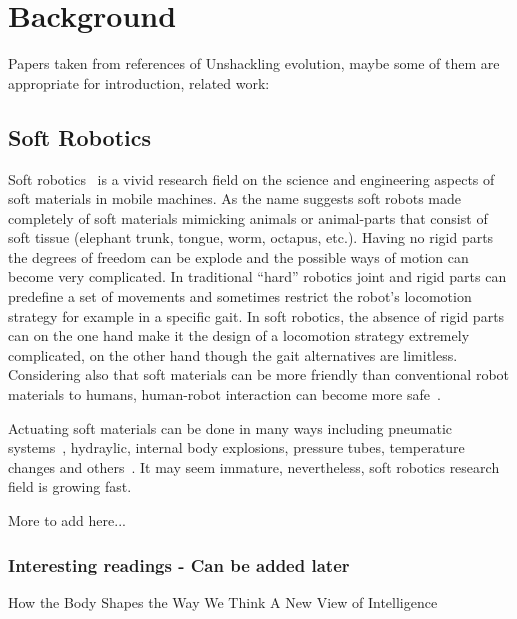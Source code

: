 
\chapter{Background} %

\label{Background} %




Papers taken from references of Unshackling evolution, maybe some of them are appropriate for introduction, related work:\\
\cite{stanley2003taxonomy}


\section{Soft Robotics}

Soft robotics~\cite{trivedi2008soft, pfeifer2012challenges} is a vivid research field on the science and engineering aspects of soft materials in mobile machines. As the name suggests soft robots made completely of soft materials mimicking animals or animal-parts that consist of soft tissue (elephant trunk, tongue, worm, octapus, etc.). Having no rigid parts the degrees of freedom can be explode and the possible ways of motion can become very complicated. In traditional ``hard'' robotics joint and rigid parts can predefine a set of movements and sometimes restrict the robot's locomotion strategy for example in a specific gait. In soft robotics, the absence of rigid parts can on the one hand make it the design of a locomotion strategy extremely complicated, on the other hand though the gait alternatives are limitless. Considering also that soft materials can be more friendly than conventional robot materials to humans, human-robot interaction can become more safe~\cite{sanan2011continuum}.

Actuating soft materials can be done in many ways including pneumatic systems~\cite{ilievski2011soft, shepherd2011multigait}, hydraylic, internal body explosions, pressure tubes, temperature changes and others~\cite{laschi2012soft, seok2010peristaltic}. It may seem immature, nevertheless, soft robotics research field is growing fast.

More to add here...


\subsection*{Interesting readings - Can be added later}
How the Body Shapes the Way We Think A New View of Intelligence~\cite{pfeifer2007body}
\cite{albu2008soft}



